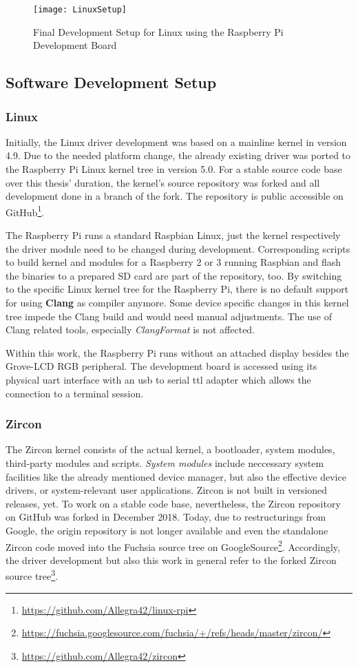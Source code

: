 \begin{figure} [ht]
    \centering
    \texttt{[image: LinuxSetup]}
    \caption{Final Development Setup for Linux using the Raspberry Pi Development Board}\label{pic:linuxsetup}
\end{figure} 


\subsection{Software Development Setup}
\subsubsection*{Linux}
Initially, the Linux driver development was based on a mainline kernel in version 4.9.
Due to the needed platform change, the already existing driver was ported to the Raspberry Pi Linux kernel tree in version 5.0.
For a stable source code base over this thesis' duration, the kernel's source repository was forked and all development done in a branch of the fork.
The repository is public accessible on GitHub\footnote{\url{https://github.com/Allegra42/linux-rpi}}.

The Raspberry Pi runs a standard Raspbian Linux, just the kernel respectively the driver module need to be changed during development.
Corresponding scripts to build kernel and modules for a Raspberry 2 or 3 running Raspbian and flash the binaries to a prepared SD card are part of the repository, too.
By switching to the specific Linux kernel tree for the Raspberry Pi, there is no default support for using \textbf{Clang} as compiler anymore.
Some device specific changes in this kernel tree impede the Clang build and would need manual adjustments.
The use of Clang related tools, especially \textit{ClangFormat} is not affected.

Within this work, the Raspberry Pi runs without an attached display besides the Grove-LCD RGB peripheral.
The development board is accessed using its physical \ac{uart} interface with an \ac{usb} to serial \ac{ttl} adapter which allows the connection to a terminal session.


\subsubsection*{Zircon}
The Zircon kernel consists of the actual kernel, a bootloader, system modules, third-party modules and scripts.
\textit{System modules} include neccessary system facilities like the already mentioned device manager, but also the effective device drivers, or system-relevant user applications.
Zircon is not built in versioned releases, yet.
To work on a stable code base, nevertheless, the Zircon repository on GitHub was forked in December 2018.
Today, due to restructurings from Google, the origin repository is not longer available and even the standalone Zircon code moved into the Fuchsia source tree on GoogleSource\footnote{\url{https://fuchsia.googlesource.com/fuchsia/+/refs/heads/master/zircon/}}.
Accordingly, the driver development but also this work in general refer to the forked Zircon source tree\footnote{\url{https://github.com/Allegra42/zircon}}.

